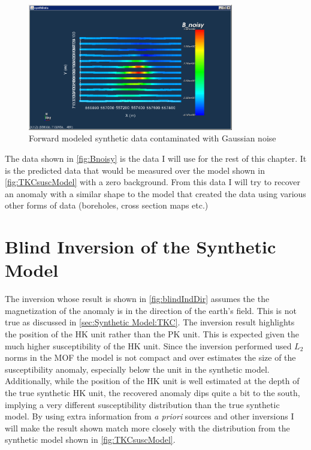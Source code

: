 \begin{figure} [h]
   \centering
   \includegraphics[width=0.8\textwidth]{images/TKC/Bnoisy.PNG}
   \caption{Forward modeled synthetic data contaminated with Gaussian noise}
   \label{fig:Bnoisy}
\end{figure}

The data shown in \autoref{fig:Bnoisy} is the data I will use for the rest of this chapter. It is the predicted data that would be measured over the model shown in \autoref{fig:TKCsuscModel} with a zero background. From this data I will try to recover an anomaly with a similar shape to the model that created the data using various other forms of data (boreholes, cross section maps etc.)


\FloatBarrier
\section{Blind Inversion of the Synthetic Model}
\label{sec:Blind Inversion of the Synthetic Model:TKC}

The inversion whose result is shown in \autoref{fig:blindIndDir} assumes the the magnetization of the anomaly is in the direction of the earth's field. This is not true as discussed in \autoref{sec:Synthetic Model:TKC}. The inversion result highlights the position of the HK unit rather than the PK unit. This is expected given the much higher susceptibility of the HK unit. Since the inversion performed used $L_2$ norms in the \ac{MOF} the model is not compact and over estimates the size of the susceptibility anomaly, especially below the unit in the synthetic model. Additionally, while the position of the HK unit is well estimated at the depth of the true synthetic HK unit, the recovered anomaly dips quite a bit to the south, implying a very different susceptibility distribution than the true synthetic model. By using extra information from \emph{a priori} sources and other inversions I will make the result shown match more closely with the distribution from the synthetic model shown in \autoref{fig:TKCsuscModel}.

